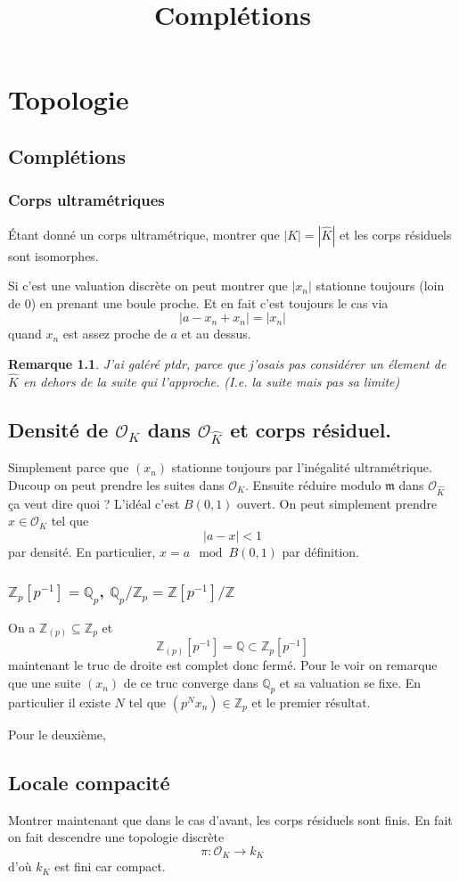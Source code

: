 \documentclass[a4paper,12pt]{book}
\title{Complétions}
\date{}
\newcommand{\Z}{\mathbb{Z}}
\newcommand{\Q}{\mathbb{Q}}
\newcommand{\Or}{\mathcal{O}}
\newcommand{\m}{\mathfrak m}
\theoremstyle{plain}
\newtheorem{rem}{Remarque}
\theoremstyle{definition}
\theoremstyle{remark}
\begin{document}
\maketitle

\chapter{Topologie}
\section{Complétions}
\subsection{Corps ultramétriques}
Étant donné un corps ultramétrique, montrer
que $|K|=|\hat K|$ et les corps résiduels sont isomorphes.

Si c'est une valuation discrète on peut montrer que $|x_n|$ 
stationne toujours (loin de 0) en prenant une boule proche. Et en
fait c'est toujours le cas via
\[|a-x_n+x_n|=|x_n|\]
quand $x_n$ est assez proche de $a$ et au dessus. 
\begin{rem}
    J'ai galéré ptdr, parce que j'osais pas considérer un élement
    de $\hat K$ en dehors de la suite qui l'approche. (I.e. la 
    suite mais pas sa limite)
\end{rem}

\section{Densité de $\Or_K$ dans $\Or_{\hat K}$ et corps résiduel.}
Simplement parce que $(x_n)$ stationne toujours par
l'inégalité ultramétrique. Ducoup on peut prendre les suites
dans $\Or_K$. Ensuite réduire modulo $\m$ dans $\Or_{\hat K}$
ça veut dire quoi ? L'idéal c'est $B(0,1)$ ouvert. On peut
simplement prendre $x\in \Or_K$ tel que 
\[|a-x|<1\]
par densité. En particulier, $x=a\mod B(0,1)$ par définition.

\subsection{$\Z_p[p^{-1}]=\Q_p$, $\Q_p/\Z_p=\Z[p^{-1}]/\Z$}
On a $\Z_{(p)}\subseteq \Z_p$ et 
\[\Z_{(p)}[p^{-1}]=\Q\subset \Z_p[p^{-1}]\]
maintenant le truc de droite est complet donc fermé. Pour le voir
on remarque que une suite $(x_n)$ de ce truc converge dans $\Q_p$
et sa valuation se fixe. En particulier il existe $N$ tel que 
$(p^Nx_n)\in \Z_p$ et le premier résultat.

Pour le deuxième,
\section{Locale compacité}
Montrer maintenant que dans le cas d'avant, les corps résiduels 
sont finis. En fait on fait descendre une topologie discrète
\[\pi \colon \Or_K\to k_K\]
d'où $k_K$ est fini car compact.


\section{}
\end{document}
